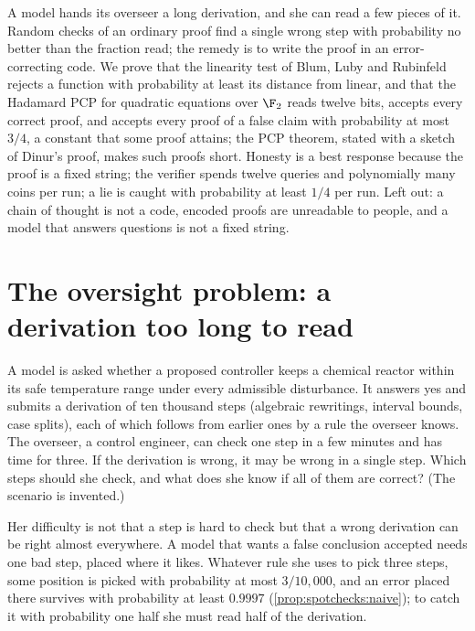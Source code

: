 \begin{refsection}
\newcommand{\spotchecksquadeq}{\textsc{QuadEq}}

\begin{chaptersummary}
A model hands its overseer a long derivation, and she can read a few pieces of it. Random checks of an ordinary proof find a single wrong step with probability no better than the fraction read; the remedy is to write the proof in an error-correcting code. We prove that the linearity test of Blum, Luby and Rubinfeld rejects a function with probability at least its distance from linear, and that the Hadamard PCP for quadratic equations over $\F_2$ reads twelve bits, accepts every correct proof, and accepts every proof of a false claim with probability at most $3/4$, a constant that some proof attains; the PCP theorem, stated with a sketch of Dinur's proof, makes such proofs short. Honesty is a best response because the proof is a fixed string; the verifier spends twelve queries and polynomially many coins per run; a lie is caught with probability at least $1/4$ per run. Left out: a chain of thought is not a code, encoded proofs are unreadable to people, and a model that answers questions is not a fixed string.
\end{chaptersummary}

\section{The oversight problem: a derivation too long to read}\label{sec:spotchecks:problem}

\begin{oversight}
A model is asked whether a proposed controller keeps a chemical reactor within its safe temperature range under every admissible disturbance. It answers yes and submits a derivation of ten thousand steps (algebraic rewritings, interval bounds, case splits), each of which follows from earlier ones by a rule the overseer knows. The overseer, a control engineer, can check one step in a few minutes and has time for three. If the derivation is wrong, it may be wrong in a single step. Which steps should she check, and what does she know if all of them are correct? (The scenario is invented.)
\end{oversight}

Her difficulty is not that a step is hard to check but that a wrong derivation can be right almost everywhere. A model that wants a false conclusion accepted needs one bad step, placed where it likes. Whatever rule she uses to pick three steps, some position is picked with probability at most $3/10{,}000$, and an error placed there survives with probability at least $0.9997$ (\cref{prop:spotchecks:naive}); to catch it with probability one half she must read half of the derivation.


\end{refsection}
